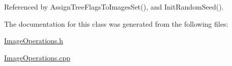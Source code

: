 Referenced by Assign\+Tree\+Flags\+To\+Images\+Set(), and Init\+Random\+Seed().



The documentation for this class was generated from the following files\+:\begin{DoxyCompactItemize}
\item 
\hyperlink{ImageOperations_8h}{Image\+Operations.\+h}\item 
\hyperlink{ImageOperations_8cpp}{Image\+Operations.\+cpp}\end{DoxyCompactItemize}
